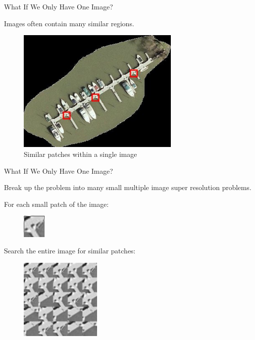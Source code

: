 \documentclass{beamer}
\begin{document}

\begin{frame}{What If We Only Have One Image?}

\vspace{0.3cm}

Images often contain many similar regions.

\vspace{0.3cm}

\begin{figure}
\centering
\includegraphics[width=0.7\textwidth]{boatsmall_similar_patches.jpg}
\caption{Similar patches within a single image}
\end{figure}

\end{frame}


\begin{frame}{What If We Only Have One Image?}

Break up the problem into many small multiple image super resolution problems.

\vspace{0.3cm}

For each small patch of the image:

\begin{figure}
\centering
\includegraphics[width=0.1\textwidth]{similar_patches_3.png}
\end{figure}

Search the entire image for similar patches:

\begin{figure}
\centering
\includegraphics[width=0.35\textwidth]{similar_patches_2.png}
\end{figure}

\end{frame}
\end{document}
